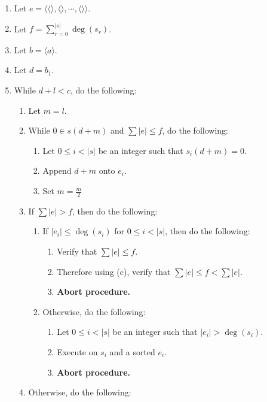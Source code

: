\documentclass[twocolumn]{article}
\newcommand{\procedurehr}[2][]{\hyperref[sec:procedure #2]{\ifthenelse{\equal{#1}{}}{procedure #2}{#1}}}
\begin{document}
				\begin{enumerate}
					\item Let $e=\langle\langle\rangle,\langle\rangle,\cdots,\langle\rangle\rangle$.
					\item Let $f=\sum_{r=0}^{\lvert s\rvert}\deg(s_r)$.
					\item Let $b=\langle a\rangle$.
					\item Let $d=b_1$.
					\item While $d+l<c$, do the following:
					\begin{enumerate}
						\item Let $m=l$.
						\item While $0\in s(d+m)$ and $\sum\lvert e\rvert\le f$, do the following:
						\begin{enumerate}
							\item Let $0\le i<\lvert s\rvert$ be an integer such that $s_i(d+m)=0$.
							\item Append $d+m$ onto $e_i$.
							\item Set $m=\frac{m}{2}$
						\end{enumerate}
						\item If $\sum\lvert e\rvert>f$, then do the following:
						\begin{enumerate}
							\item If $\lvert e_i\rvert\le\deg(s_i)$ for $0\le i<\lvert s\rvert$, then do the following:
							\begin{enumerate}
								\item Verify that $\sum\lvert e\rvert\le f$.
								\item Therefore using (c), verify that $\sum\lvert e\rvert\le f<\sum\lvert e\rvert$.
								\item \textbf{Abort procedure.}
							\end{enumerate}
							\item Otherwise, do the following:
							\begin{enumerate}
								\item Let $0\le i<\lvert s\rvert$ be an integer such that $\lvert e_i\rvert>\deg(s_i)$.
								\item Execute \procedurehr{2.01} on $s_i$ and a sorted $e_i$.
								\item \textbf{Abort procedure.}
							\end{enumerate}
						\end{enumerate}
						\item Otherwise, do the following:
						\begin{enumerate}

\end{enumerate}
\end{enumerate}
\end{enumerate}
\end{document}
